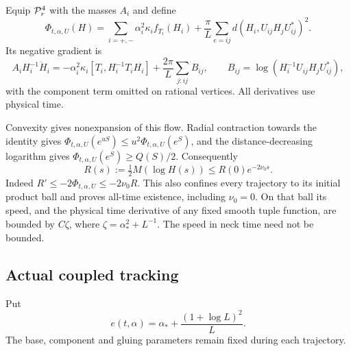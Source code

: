 Equip $\mathcal P_r^4$ with the masses $A_i$ and
define
\[
 \Phi_{t,\alpha,U}(H)=\sum_{i=+,-}\alpha_i^2\kappa_i f_{T_i}(H_i)
        +\frac{\pi}{L}\sum_{e=ij}d(H_i,U_{ij}H_jU_{ij}^*)^2.
\]
Its negative gradient is
\begin{equation}\label{eq:coupled-flow}
 A_iH_i^{-1}\dot H_i
 =-\alpha_i^2\kappa_i[T_i,H_i^{-1}T_iH_i]
          +\frac{2\pi}{L}\sum_{j:ij}B_{ij},
 \qquad B_{ij}=\log(H_i^{-1}U_{ij}H_jU_{ij}^*),
\end{equation}
with the component term omitted on rational
vertices. All derivatives use physical time.

Convexity gives nonexpansion of this flow.
Radial contraction towards the identity
gives $\Phi_{t,\alpha,U}(e^{uS})\le u^2\Phi_{t,\alpha,U}(e^S)$,
and the distance-decreasing logarithm gives
$\Phi_{t,\alpha,U}(e^S)\ge Q(S)/2$.
Consequently
\begin{equation}\label{eq:coupled-decay}
 R(s):=\tfrac12 M(\log H(s))
 \le R(0)e^{-2\nu_0s}.
\end{equation}
Indeed $R'\le-2\Phi_{t,\alpha,U}\le-2\nu_0R$.
This also confines every trajectory to its
initial product ball and proves all-time
existence, including $\nu_0=0$.
On that ball its speed, and the physical
time derivative of any fixed smooth tuple
function, are bounded by $C\zeta$, where
$\zeta=\alpha_*^2+L^{-1}$.
The speed in neck time need not be bounded.

\subsection{Actual coupled tracking}
Put
\[
 e(t,\alpha)=\alpha_*+\frac{(1+\log L)^2}{L}.
\]
The base, component and gluing parameters
remain fixed during each trajectory.

